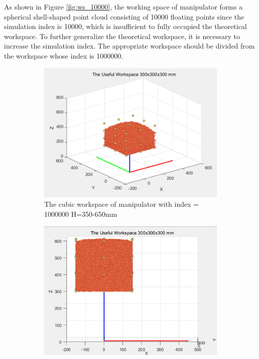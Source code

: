 \noindent As shown in Figure \ref{fig:ws_10000}, the working space of manipulator forms a spherical shell-shaped 
point cloud consisting of 10000 floating points since the simulation index is 10000, which is insufficient to fully 
occupied the theoretical workspace. To further generalize the theoretical workspace, it is necessary to increase 
the simulation index. The appropriate workspace should be divided from the workspace whose index is 1000000. 
\begin{figure}[H] %
    \centering 
    \captionsetup{labelsep=colon}
    \begin{subfigure}{0.45\textwidth} %
        \centering
        \includegraphics[width=\linewidth]{Image/Result/rect_workspace_1000000_350-650.png}
        \caption{\centering The cubic workspace of manipulator with index = 1000000 H=350-650mm}
        \label{fig:ws_1000000_350}
    \end{subfigure}
    \hfill
    \begin{subfigure}{0.45\textwidth} %
        \centering
        \includegraphics[width=\linewidth]{Image/Result/rect_workspace_1000000_300-600.png}

\end{subfigure}
\end{figure}
